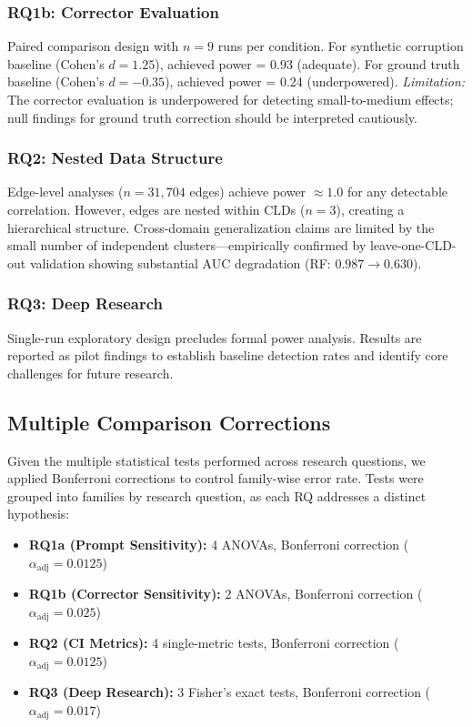 \subsubsection{RQ1b: Corrector Evaluation}
Paired comparison design with $n=9$ runs per condition. For synthetic corruption baseline (Cohen's $d = 1.25$), achieved power = 0.93 (adequate). For ground truth baseline (Cohen's $d = -0.35$), achieved power = 0.24 (underpowered). \textit{Limitation:} The corrector evaluation is underpowered for detecting small-to-medium effects; null findings for ground truth correction should be interpreted cautiously.

\subsubsection{RQ2: Nested Data Structure}
Edge-level analyses ($n = 31{,}704$ edges) achieve power $\approx 1.0$ for any detectable correlation. However, edges are nested within CLDs ($n = 3$), creating a hierarchical structure. Cross-domain generalization claims are limited by the small number of independent clusters---empirically confirmed by leave-one-CLD-out validation showing substantial AUC degradation (RF: $0.987 \rightarrow 0.630$).

\subsubsection{RQ3: Deep Research}
Single-run exploratory design precludes formal power analysis. Results are reported as pilot findings to establish baseline detection rates and identify core challenges for future research.

\subsection{Multiple Comparison Corrections}

Given the multiple statistical tests performed across research questions, we applied Bonferroni corrections to control family-wise error rate. Tests were grouped into families by research question, as each RQ addresses a distinct hypothesis:

\begin{itemize}[noitemsep]
    \item \textbf{RQ1a (Prompt Sensitivity):} 4 ANOVAs, Bonferroni correction ($\alpha_{\text{adj}} = 0.0125$)
    \item \textbf{RQ1b (Corrector Sensitivity):} 2 ANOVAs, Bonferroni correction ($\alpha_{\text{adj}} = 0.025$)
    \item \textbf{RQ2 (CI Metrics):} 4 single-metric tests, Bonferroni correction ($\alpha_{\text{adj}} = 0.0125$)
    \item \textbf{RQ3 (Deep Research):} 3 Fisher's exact tests, Bonferroni correction ($\alpha_{\text{adj}} = 0.017$)
\end{itemize}

